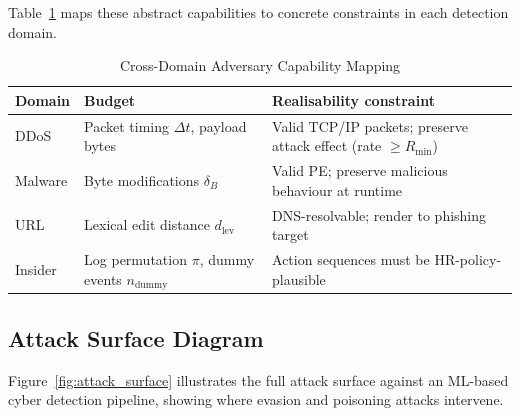 \documentclass[sigconf,nonacm]{acmart}
\begin{document}
Table~\ref{tab:threat_mapping} maps these abstract capabilities to concrete
constraints in each detection domain.

\begin{table}[h]
\caption{Cross-Domain Adversary Capability Mapping}
\label{tab:threat_mapping}
\small
\begin{tabularx}{\columnwidth}{@{}p{1.5cm}p{1.7cm}X@{}}
\toprule
\textbf{Domain} & \textbf{Budget} & \textbf{Realisability constraint} \\
\midrule
DDoS & Packet timing $\Delta t$, payload bytes & Valid TCP/IP packets; preserve attack effect (rate $\geq R_\text{min}$) \\
Malware & Byte modifications $\delta_B$ & Valid PE; preserve malicious behaviour at runtime \\
URL & Lexical edit distance $d_\text{lev}$ & DNS-resolvable; render to phishing target \\
Insider & Log permutation $\pi$, dummy events $n_\text{dummy}$ & Action sequences must be HR-policy-plausible \\
\bottomrule
\end{tabularx}
\end{table}

\subsection{Attack Surface Diagram}

Figure~\ref{fig:attack_surface} illustrates the full attack surface against an
ML-based cyber detection pipeline, showing where evasion and poisoning attacks
intervene.
\end{document}
